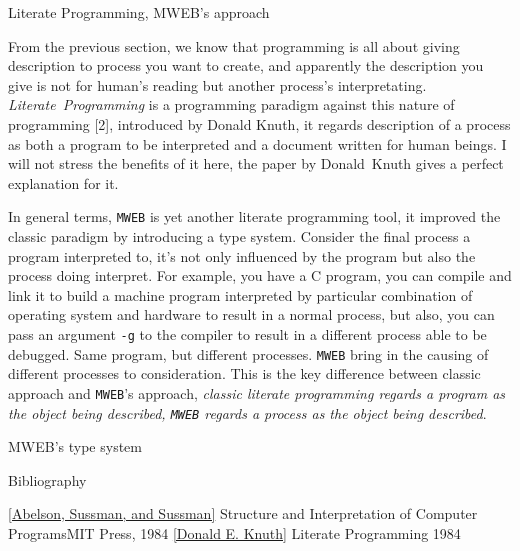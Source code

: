 \beginsection Literate Programming, MWEB's approach\par

From the previous section, we know that programming is all about giving description to process you want
to create, and apparently the description you give is not for human's reading but another process's interpretating.
{\it Literate~Programming} is a programming paradigm against this nature of programming [2], introduced by
Donald Knuth, it regards description of a process as both a program to be interpreted and a document written
for human beings.  I will not stress the benefits of it here, the paper by Donald~Knuth gives
a perfect explanation for it.

In general terms, {\tt MWEB} is yet another literate programming tool, it improved the classic paradigm
by introducing a type system.  Consider the final process a program interpreted to, it's not only
influenced by the program but also the process doing interpret.  For example, you have a C program,
you can compile and link it to build a machine program interpreted by particular combination of operating system
and hardware to result in a normal process, but also, you can pass an argument {\tt -g} to the compiler
to result in a different process able to be debugged.  Same program, but different processes.
{\tt MWEB} bring in the causing of different processes to consideration.  This is
the key difference between classic approach and {\tt MWEB}'s approach, {\it classic literate programming
regards a program as the object being described, {\tt MWEB} regards a process as the object being described}.

\beginsection MWEB's type system\par

\beginsection Bibliography\par

\ref {Abelson, Sussman, and Sussman} {Structure and Interpretation of Computer Programs}{MIT Press, 1984}
\ref {Donald E. Knuth} {Literate Programming} {1984}

\bye
